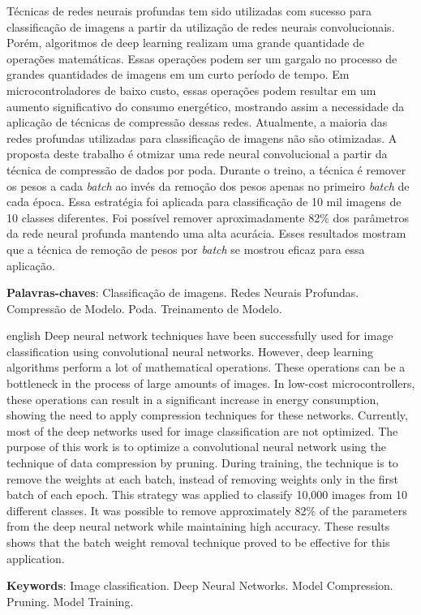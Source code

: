 \setlength{\absparsep}{18pt} %
\begin{resumo}
Técnicas de redes neurais profundas tem sido utilizadas com sucesso para classificação de imagens a partir da utilização de redes neurais convolucionais. Porém, algoritmos de deep learning realizam uma grande quantidade de operações matemáticas. Essas operações podem ser um gargalo no processo de grandes quantidades de imagens em um curto período de tempo. Em microcontroladores de baixo custo, essas operações podem resultar em um aumento significativo do consumo energético, mostrando assim a necessidade da aplicação de técnicas de compressão dessas redes. Atualmente, a maioria das redes profundas utilizadas para classificação de imagens não são otimizadas. A proposta deste trabalho é otmizar uma rede neural convolucional a partir da técnica de compressão de dados por poda. Durante o treino, a técnica é remover os pesos a cada \textit{batch} ao invés da remoção dos pesos apenas no primeiro \textit{batch} de cada época. Essa estratégia foi aplicada para classificação de 10 mil imagens de 10 classes diferentes. Foi possível remover aproximadamente 82\% dos parâmetros da rede neural profunda mantendo uma alta acurácia. Esses resultados mostram que a técnica de remoção de pesos por \textit{batch} se mostrou eficaz para essa aplicação.


\textbf{Palavras-chaves}: Classificação de imagens. Redes Neurais Profundas. Compressão de Modelo. Poda. Treinamento de Modelo.

\end{resumo}
\begin{resumo}[Abstract]
	\begin{otherlanguage*}{english}
	Deep neural network techniques have been successfully used for image classification using convolutional neural networks. However, deep learning algorithms perform a lot of mathematical operations. These operations can be a bottleneck in the process of large amounts of images. In low-cost microcontrollers, these operations can result in a significant increase in energy consumption, showing the need to apply compression techniques for these networks. Currently, most of the deep networks used for image classification are not optimized. The purpose of this work is to optimize a convolutional neural network using the technique of data compression by pruning. During training, the technique is to remove the weights at each batch, instead of removing weights only in the first batch of each epoch. This strategy was applied to classify 10,000 images from 10 different classes. It was possible to remove approximately 82\% of the parameters from the deep neural network while maintaining high accuracy. These results shows that the batch weight removal technique proved to be effective for this application.
%	
	
	\textbf{Keywords}: Image classification. Deep Neural Networks. Model Compression. Pruning. Model Training.
	\end{otherlanguage*}
\end{resumo}